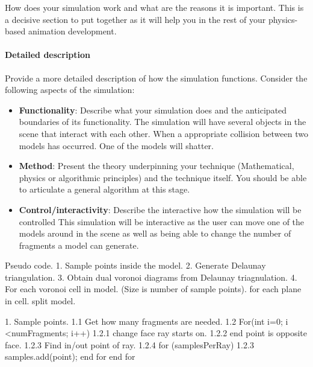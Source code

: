 \documentclass[conference,backref=page]{acmsiggraph}
\begin{document}
How does your simulation work and what are the reasons it is important.  This is a decisive section to put together as it will help you in the rest of your physics-based animation development.

\paragraph{Detailed description}
Provide a more detailed description of how the simulation functions. Consider the following aspects of the simulation:
\begin{itemize}
\item {\bf Functionality}: Describe what your simulation does and the anticipated boundaries of its functionality.
 The simulation will have several objects in the scene that interact with each other. When a appropriate collision between two models has occurred. One of the models will shatter.
 
\item {\bf Method}: Present the theory underpinning your technique (Mathematical, physics or algorithmic principles) and the technique itself. You should be able to articulate a general algorithm at this stage.
\item {\bf Control/interactivity}: Describe the interactive how the simulation will be controlled
 This simulation will be interactive as the user can move one of the models around in the scene as well as being able to change the number of fragments a model can generate. 
\end{itemize}


















Pseudo code.
1. Sample points inside the model.
2. Generate Delaunay triangulation.
3. Obtain dual voronoi diagrams from Delaunay triagnulation.
4. For each voronoi cell in model. (Size is number of sample points).
		for each plane in cell.
				split model.



1. Sample points.
1.1 Get how many fragments are needed.
1.2 For(int i=0; i <numFragments; i++)
		1.2.1 change face ray starts on.
			1.2.2 end point is opposite face.
			 1.2.3 Find in/out point of ray.
			 1.2.4 for (samplesPerRay)
			    1.2.3 samples.add(point);
			    end for
			end for
\end{document}
